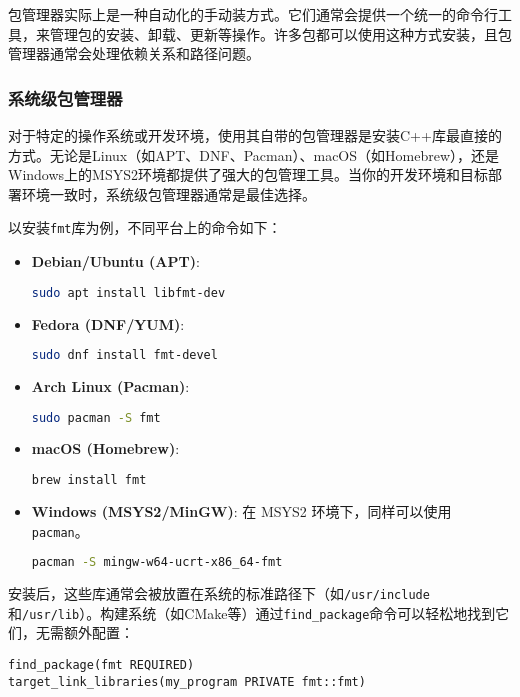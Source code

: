 包管理器实际上是一种自动化的手动装方式。它们通常会提供一个统一的命令行工具，来管理包的安装、卸载、更新等操作。许多包都可以使用这种方式安装，且包管理器通常会处理依赖关系和路径问题。

\subsubsection{系统级包管理器}

对于特定的操作系统或开发环境，使用其自带的包管理器是安装C++库最直接的方式。无论是Linux（如APT、DNF、Pacman）、macOS（如Homebrew），还是 Windows上的MSYS2环境都提供了强大的包管理工具。当你的开发环境和目标部署环境一致时，系统级包管理器通常是最佳选择。

以安装\texttt{fmt}库为例，不同平台上的命令如下：

\begin{itemize}
  \item \textbf{Debian/Ubuntu (APT)}:
    \begin{lstlisting}[language=bash]
sudo apt install libfmt-dev
    \end{lstlisting}
  \item \textbf{Fedora (DNF/YUM)}:
    \begin{lstlisting}[language=bash]
sudo dnf install fmt-devel
    \end{lstlisting}
  \item \textbf{Arch Linux (Pacman)}:
    \begin{lstlisting}[language=bash]
sudo pacman -S fmt
    \end{lstlisting}
  \item \textbf{macOS (Homebrew)}:
    \begin{lstlisting}[language=bash]
brew install fmt
    \end{lstlisting}
  \item \textbf{Windows (MSYS2/MinGW)}: 在 MSYS2 环境下，同样可以使用 \texttt{pacman}。
    \begin{lstlisting}[language=bash]
pacman -S mingw-w64-ucrt-x86_64-fmt
    \end{lstlisting}
\end{itemize}

安装后，这些库通常会被放置在系统的标准路径下（如\texttt{/usr/include}和\texttt{/usr/lib}）。构建系统（如CMake等）通过\texttt{find\_package}命令可以轻松地找到它们，无需额外配置：
\begin{lstlisting}
find_package(fmt REQUIRED)
target_link_libraries(my_program PRIVATE fmt::fmt)
\end{lstlisting}

